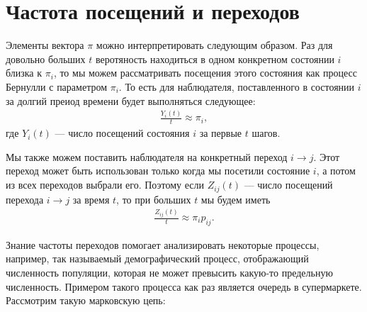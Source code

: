 \documentclass[12pt]{article}
\begin{document}
\section{Частота посещений и переходов}

Элементы вектора $\pi$ можно интерпретировать следующим образом. Раз для довольно больших $t$ веротяность находиться в одном конкретном состоянии $i$ близка к $\pi_i$, то мы можем рассматривать посещения этого состояния как процесс Бернулли с параметром $\pi_i$. То есть для наблюдателя, поставленного в состоянии $i$ за долгий преиод времени будет выполняться следующее:
\begin{align*}
  \frac{Y_i(t)}{t} \approx \pi_i,
\end{align*}
где $Y_i(t)$ --- число посещений состояния $i$ за первые $t$ шагов.

Мы также можем поставить наблюдателя на конкретный переход $i \to j$. Этот переход может быть использован только когда мы посетили состояние $i$, а потом из всех переходов выбрали его. Поэтому если $Z_{ij}(t)$ --- число посещений перехода $i \to j$ за время $t$, то при больших $t$ мы будем иметь
\begin{align*}
  \frac{Z_{ij}(t)}{t} \approx \pi_i p_{ij}.
\end{align*}

Знание частоты переходов помогает анализировать некоторые процессы, например, так называемый демографический процесс, отображающий численность популяции, которая не может превысить какую-то предельную численность. Примером такого процесса как раз является очередь в супермаркете. Рассмотрим такую марковскую цепь:
\end{document}

